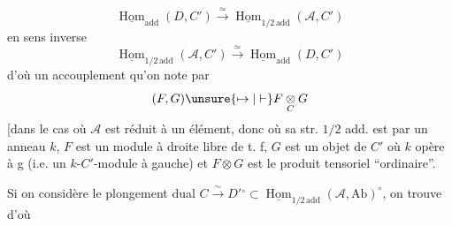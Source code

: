 \[
 \underline{\operatorname{Hom}}_{\mathrm{add}}(D,C')\xrightarrow{\simeq}
 \underline{\operatorname{Hom}}_{1/2\,\mathrm{add}}(\mathcal A,C')
\]
 en sens inverse
\[
 \underline{\operatorname{Hom}}_{1/2\,\mathrm{add}}(\mathcal A,C')\xrightarrow{\simeq}
 \underline{\operatorname{Hom}}_{\mathrm{add}}(D,C')
\]
d'où un accouplement
qu'on note par 
\[
 (F,G)\unsure{\mapsto|\vdash} F\underset{C}{\otimes}G
\]
[dans le cas où $\mathcal A$ est réduit à un
élément, donc où sa str. $1/2$ add. est
 par un anneau $k$,
$F$ est un module à droite libre de
t. f, $G$ est un objet de $C'$ où $k$
opère à g (i.e. un $k$-$C'$-module
à gauche) et $F\otimes G$ est le
produit tensoriel ``ordinaire''.

Si on considère le plongement
dual $C\xrightarrow{\sim}D'{}^\circ\subset\underline{\operatorname{Hom}}_{1/2\,\mathrm{add}}(\mathcal A,\mathrm{Ab})^\circ$,
on trouve
d'où
